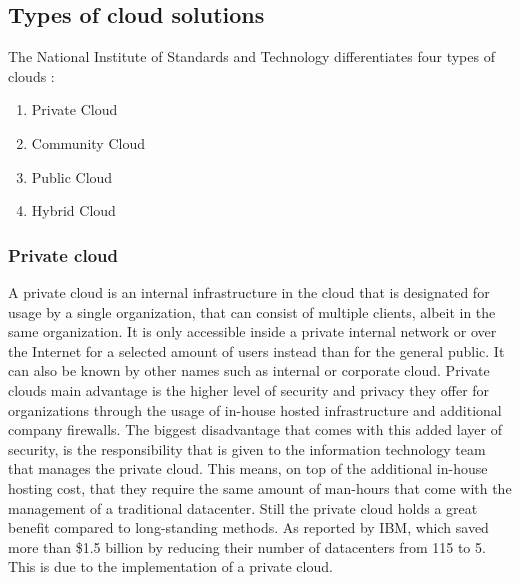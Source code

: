 \subsection{Types of cloud solutions}

The National Institute of Standards and Technology differentiates four types of clouds \autocite{Mell2011}:
\begin{enumerate}
	\item Private Cloud
	\item Community Cloud
	\item Public Cloud
	\item Hybrid Cloud
\end{enumerate}	


\subsubsection{Private cloud}
A private cloud is an internal infrastructure in the cloud that is designated for usage by a single organization, that can consist of multiple clients, albeit in the same organization. It is only accessible inside a private internal network or over the Internet for a selected amount of users instead than for the general public. It can also be known by other names such as internal or corporate cloud. Private clouds main advantage is the higher level of security and privacy they offer for organizations through the usage of in-house hosted infrastructure and additional company firewalls. The biggest disadvantage that comes with this added layer of security, is the responsibility that is given to the information technology team that manages the private cloud. This means, on top of the additional in-house hosting cost, that they require the same amount of man-hours that come with the management of a traditional datacenter. 
Still the private cloud holds a great benefit compared to long-standing methods. As reported by IBM, which saved more than \$1.5 billion by reducing their number of datacenters from 115 to 5. This is due to the implementation of a private cloud. \autocite{Hofmann2010} 


